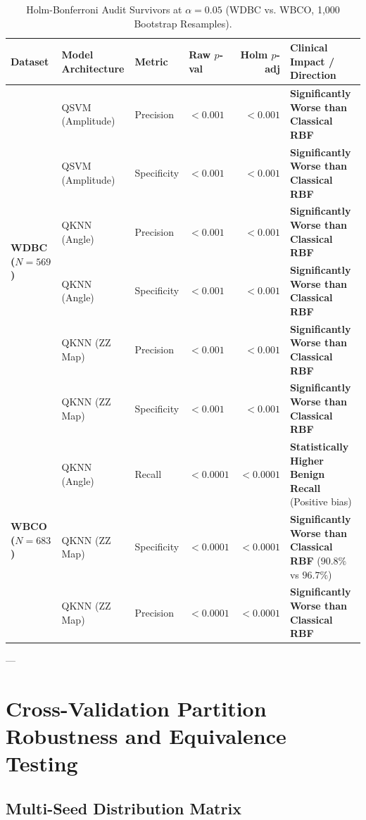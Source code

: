 \documentclass[11pt,a4paper]{article}
\begin{document}
\begin{table}[H]
\centering
\small
\caption{Holm-Bonferroni Audit Survivors at $\alpha=0.05$ (WDBC vs. WBCO, 1,000 Bootstrap Resamples).}
\label{tab:holm_summary}
\begin{tabularx}{\textwidth}{llllrl}
\toprule
\textbf{Dataset} & \textbf{Model Architecture} & \textbf{Metric} & \textbf{Raw $p$-val} & \textbf{Holm $p$-adj} & \textbf{Clinical Impact / Direction} \\
\midrule
\multirow{6}{*}{\textbf{WDBC ($N=569$)}} 
& QSVM (Amplitude) & Precision & $<0.001$ & $<0.001$ & \textbf{Significantly Worse than Classical RBF} \\
& QSVM (Amplitude) & Specificity & $<0.001$ & $<0.001$ & \textbf{Significantly Worse than Classical RBF} \\
& QKNN (Angle) & Precision & $<0.001$ & $<0.001$ & \textbf{Significantly Worse than Classical RBF} \\
& QKNN (Angle) & Specificity & $<0.001$ & $<0.001$ & \textbf{Significantly Worse than Classical RBF} \\
& QKNN (ZZ Map) & Precision & $<0.001$ & $<0.001$ & \textbf{Significantly Worse than Classical RBF} \\
& QKNN (ZZ Map) & Specificity & $<0.001$ & $<0.001$ & \textbf{Significantly Worse than Classical RBF} \\
\midrule
\multirow{3}{*}{\textbf{WBCO ($N=683$)}} 
& QKNN (Angle) & Recall & $<0.0001$ & $<0.0001$ & \textbf{Statistically Higher Benign Recall} (Positive bias) \\
& QKNN (ZZ Map) & Specificity & $<0.0001$ & $<0.0001$ & \textbf{Significantly Worse than Classical RBF} ($90.8\%$ vs $96.7\%$) \\
& QKNN (ZZ Map) & Precision & $<0.0001$ & $<0.0001$ & \textbf{Significantly Worse than Classical RBF} \\
\bottomrule
\end{tabularx}
\end{table}

---

\section{Cross-Validation Partition Robustness and Equivalence Testing}

\subsection{Multi-Seed Distribution Matrix}
\end{document}

